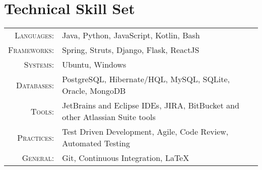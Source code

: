 \section{Technical Skill Set}

\begin{tabular}{r|p{11cm}}
	\textsc{Languages}: & Java, Python, JavaScript, Kotlin, Bash \\
	\textsc{Frameworks}: & Spring, Struts, Django, Flask, ReactJS \\
	\textsc{Systems}: & Ubuntu, Windows \\
	\textsc{Databases}: & PostgreSQL, Hibernate/HQL, MySQL, SQLite, Oracle, MongoDB \\
	\textsc{Tools}: & JetBrains and Eclipse IDEs, JIRA, BitBucket and other Atlassian Suite tools \\
	\textsc{Practices}: & Test Driven Development, Agile, Code Review, Automated Testing \\
	\textsc{General}: & Git, Continuous Integration, LaTeX \\
\end{tabular}
